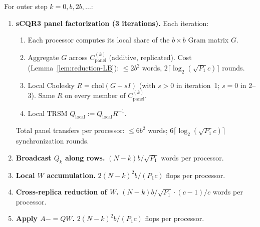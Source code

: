 \documentclass[11pt]{article}
\begin{document}
For outer step $k = 0, b, 2b, \ldots$:
\begin{enumerate}[leftmargin=2em]
  \item \textbf{sCQR3 panel factorization (3 iterations).}
    Each iteration:
    \begin{enumerate}[label=(\alph*)]
      \item Each processor computes its local share of the $b\times b$
        Gram matrix $G$.
      \item Aggregate $G$ across $C^{(k)}_{\mathrm{panel}}$ (additive,
        replicated). Cost (Lemma~\ref{lem:reduction-LB}):
        $\le 2 b^2$ words, $2\lceil\log_2(\sqrt{P_1}c)\rceil$ rounds.
      \item Local Cholesky $R = \mathrm{chol}(G + sI)$ (with $s > 0$
        in iteration~1; $s = 0$ in 2--3). Same $R$ on every member of
        $C^{(k)}_{\mathrm{panel}}$.
      \item Local TRSM $Q_{\mathrm{local}} := Q_{\mathrm{local}} R^{-1}$.
    \end{enumerate}
    Total panel transfers per processor: $\le 6 b^2$ words;
    $6\lceil\log_2(\sqrt{P_1}c)\rceil$ synchronization rounds.

  \item \textbf{Broadcast $Q_k$ along rows.} $(N-k)b/\sqrt{P_1}$ words
    per processor.

  \item \textbf{Local $W$ accumulation.} $2(N-k)^2 b/(P_1 c)$ flops
    per processor.

  \item \textbf{Cross-replica reduction of $W$.}
    $(N-k)b/\sqrt{P_1} \cdot (c-1)/c$ words per processor.

  \item \textbf{Apply $A {-}{=} QW$.} $2(N-k)^2 b/(P_1 c)$ flops per
    processor.
\end{enumerate}
\end{document}
